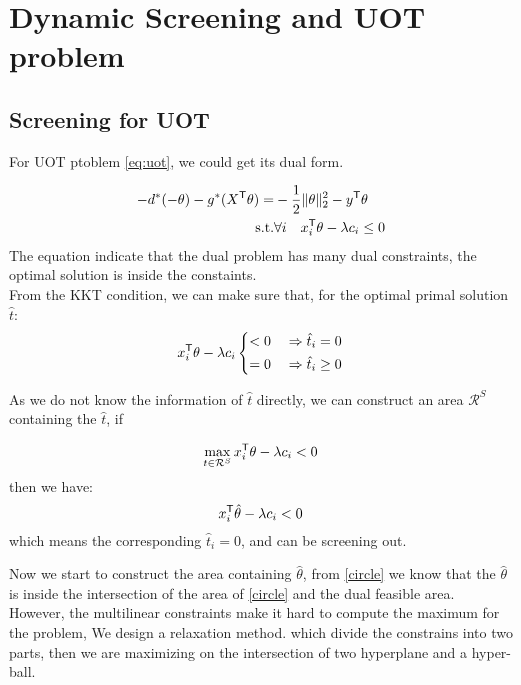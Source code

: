 \section{Dynamic Screening and UOT problem}
\subsection{Screening for UOT}

For UOT ptoblem \ref{eq:uot}, we could get its dual form. 

\begin{equation}
\begin{split}
-d^*(-\theta) - g^*(X^{\mathsf T}\theta) =& -\frac{1}{2}\|\theta\|_2^2-y^{\mathsf T}\theta \\
 \text{s.t.} &\forall i \quad x_i^{\mathsf T}\theta -\lambda c_i \leq 0
 \end{split}
 \label{eq:uotdual}
\end{equation}
The equation indicate that the dual problem has many dual constraints, the optimal solution is inside the constaints.\\
From the KKT condition, we can make sure that, for the optimal primal solution $\hat{t}$:
 \begin{equation}
\begin{split}
x_i^{\mathsf T}\theta -\lambda c_i  \left\{
\begin{aligned}
< 0 \quad& \Rightarrow \hat{t}_i = 0\\
= 0 \quad& \Rightarrow \hat{t}_i \geq 0
\end{aligned}
\right.
 \end{split}
 \label{eq:screening}
\end{equation}

As we do not know the information of $\hat{t}$ directly, we can construct an area $\mathcal{R}^{S}$ containing the $\hat{t}$, if

 \begin{equation}
\max_{t \in \mathcal{R}^S} x_i^{\mathsf T}\theta -\lambda c_i  < 0
\end{equation}
then we have:
 \begin{equation}
 x_i^{\mathsf T}\hat{\theta} -\lambda c_i  < 0
\end{equation}
which means the corresponding $\hat{t}_i = 0$, and can be screening out.

Now we start to construct the area containing $\hat{\theta}$, from \ref{circle} we know that the $\hat{\theta}$ is inside the intersection of the area of \ref{circle} and the dual feasible area. However, the multilinear constraints make it hard to compute the maximum for the problem, We design a relaxation method. which divide the constrains into two parts, then we are maximizing on the intersection of two hyperplane and a hyper-ball. 

